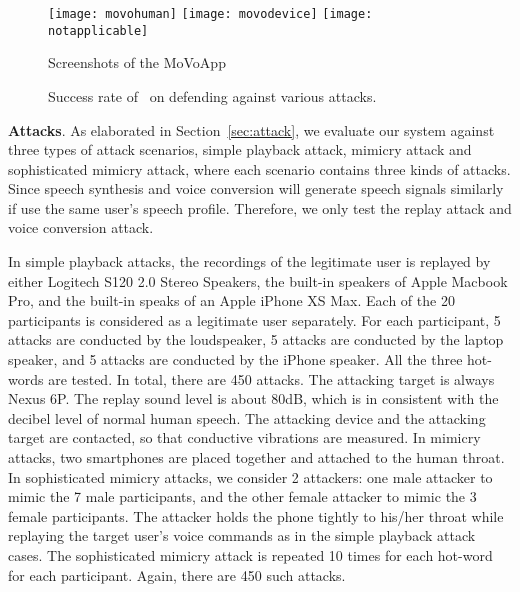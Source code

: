 \begin{figure}[h]
		\centering
	\begin{minipage}{.6\linewidth}
		\texttt{[image: movohuman]}
		\vspace{.1in}
		\texttt{[image: movodevice]}
		\vspace{.1in}
		\texttt{[image: notapplicable]}
	\end{minipage}
	\caption{Screenshots of the MoVoApp}	
	\label{fig:defendapp}
\end{figure}

\begin{figure}[h]
	\centering
	\caption{Success rate of \shortname~on defending against various attacks. }
	\label{fig:defend}
\end{figure}

\textbf{Attacks}. As elaborated in Section~\ref{sec:attack}, we evaluate our system against three types of attack scenarios, simple playback attack, mimicry attack and sophisticated mimicry attack, where each scenario contains three kinds of attacks.  Since speech synthesis and voice conversion will generate speech signals similarly if use the same user's speech profile. Therefore, we only test the replay attack and voice conversion attack.

In simple playback attacks, the recordings of the legitimate user is replayed by either Logitech S120 2.0 Stereo Speakers, the built-in speakers of Apple Macbook Pro, and the built-in speaks of an Apple iPhone XS Max. Each of the 20 participants is considered as a legitimate user separately. For each participant, 5 attacks are conducted by the loudspeaker, 5 attacks are conducted by the laptop speaker, and 5 attacks are conducted by the iPhone speaker. All the three hot-words are tested. In total, there are 450 attacks. The attacking target is always Nexus 6P. The replay sound level is about 80dB, which is in consistent with the decibel level of normal human speech. 
The attacking device and the attacking target  are contacted, so that conductive vibrations are measured. In mimicry attacks, two smartphones are placed together and attached to the human throat. In sophisticated mimicry attacks, we consider 2 attackers: one male attacker to mimic the 7 male participants, and the other female attacker to mimic the 3 female participants. The attacker holds the phone tightly to his/her throat while replaying the target user's voice commands as in the simple playback attack cases. The sophisticated mimicry attack is repeated 10 times for each hot-word for each participant. Again, there are 450 such attacks.

